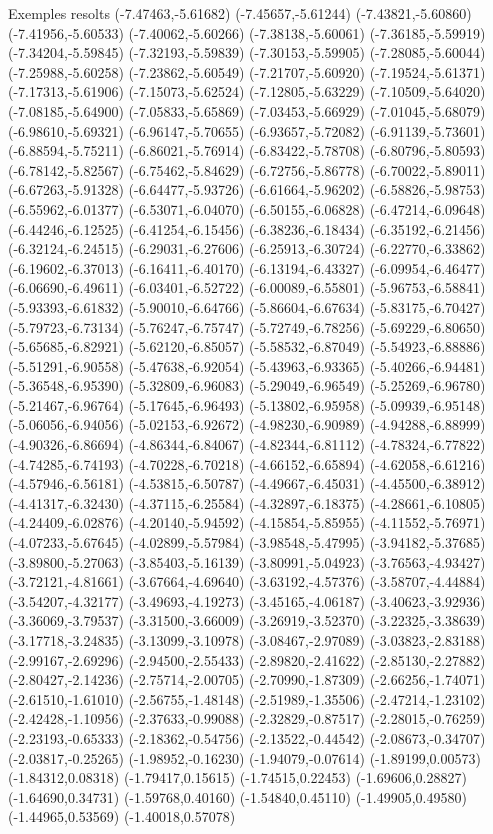 \documentclass[11pt,a4paper]{article}
\begin{document}
\begin{fmex}{Exemples resolts}
(-7.47463,-5.61682) (-7.45657,-5.61244) (-7.43821,-5.60860) (-7.41956,-5.60533) (-7.40062,-5.60266) (-7.38138,-5.60061) (-7.36185,-5.59919) (-7.34204,-5.59845) (-7.32193,-5.59839) (-7.30153,-5.59905) (-7.28085,-5.60044) (-7.25988,-5.60258) (-7.23862,-5.60549) (-7.21707,-5.60920) (-7.19524,-5.61371) (-7.17313,-5.61906) (-7.15073,-5.62524) (-7.12805,-5.63229) (-7.10509,-5.64020) (-7.08185,-5.64900) (-7.05833,-5.65869) (-7.03453,-5.66929) (-7.01045,-5.68079) (-6.98610,-5.69321) (-6.96147,-5.70655) (-6.93657,-5.72082) (-6.91139,-5.73601) (-6.88594,-5.75211) (-6.86021,-5.76914) (-6.83422,-5.78708) (-6.80796,-5.80593) (-6.78142,-5.82567) (-6.75462,-5.84629) (-6.72756,-5.86778) (-6.70022,-5.89011) (-6.67263,-5.91328) (-6.64477,-5.93726) (-6.61664,-5.96202) (-6.58826,-5.98753) (-6.55962,-6.01377) (-6.53071,-6.04070) (-6.50155,-6.06828) (-6.47214,-6.09648) (-6.44246,-6.12525) (-6.41254,-6.15456) (-6.38236,-6.18434) (-6.35192,-6.21456) (-6.32124,-6.24515) (-6.29031,-6.27606) (-6.25913,-6.30724) (-6.22770,-6.33862) (-6.19602,-6.37013) (-6.16411,-6.40170) (-6.13194,-6.43327) (-6.09954,-6.46477) (-6.06690,-6.49611) (-6.03401,-6.52722) (-6.00089,-6.55801) (-5.96753,-6.58841) (-5.93393,-6.61832) (-5.90010,-6.64766) (-5.86604,-6.67634) (-5.83175,-6.70427) (-5.79723,-6.73134) (-5.76247,-6.75747) (-5.72749,-6.78256) (-5.69229,-6.80650) (-5.65685,-6.82921) (-5.62120,-6.85057) (-5.58532,-6.87049) (-5.54923,-6.88886) (-5.51291,-6.90558) (-5.47638,-6.92054) (-5.43963,-6.93365) (-5.40266,-6.94481) (-5.36548,-6.95390) (-5.32809,-6.96083) (-5.29049,-6.96549) (-5.25269,-6.96780) (-5.21467,-6.96764) (-5.17645,-6.96493) (-5.13802,-6.95958) (-5.09939,-6.95148) (-5.06056,-6.94056) (-5.02153,-6.92672) (-4.98230,-6.90989) (-4.94288,-6.88999) (-4.90326,-6.86694) (-4.86344,-6.84067) (-4.82344,-6.81112) (-4.78324,-6.77822) (-4.74285,-6.74193) (-4.70228,-6.70218) (-4.66152,-6.65894) (-4.62058,-6.61216) (-4.57946,-6.56181) (-4.53815,-6.50787) (-4.49667,-6.45031) (-4.45500,-6.38912) (-4.41317,-6.32430) (-4.37115,-6.25584) (-4.32897,-6.18375) (-4.28661,-6.10805) (-4.24409,-6.02876) (-4.20140,-5.94592) (-4.15854,-5.85955) (-4.11552,-5.76971) (-4.07233,-5.67645) (-4.02899,-5.57984) (-3.98548,-5.47995) (-3.94182,-5.37685) (-3.89800,-5.27063) (-3.85403,-5.16139) (-3.80991,-5.04923) (-3.76563,-4.93427) (-3.72121,-4.81661) (-3.67664,-4.69640) (-3.63192,-4.57376) (-3.58707,-4.44884) (-3.54207,-4.32177) (-3.49693,-4.19273) (-3.45165,-4.06187) (-3.40623,-3.92936) (-3.36069,-3.79537) (-3.31500,-3.66009) (-3.26919,-3.52370) (-3.22325,-3.38639) (-3.17718,-3.24835) (-3.13099,-3.10978) (-3.08467,-2.97089) (-3.03823,-2.83188) (-2.99167,-2.69296) (-2.94500,-2.55433) (-2.89820,-2.41622) (-2.85130,-2.27882) (-2.80427,-2.14236) (-2.75714,-2.00705) (-2.70990,-1.87309) (-2.66256,-1.74071) (-2.61510,-1.61010) (-2.56755,-1.48148) (-2.51989,-1.35506) (-2.47214,-1.23102) (-2.42428,-1.10956) (-2.37633,-0.99088) (-2.32829,-0.87517) (-2.28015,-0.76259) (-2.23193,-0.65333) (-2.18362,-0.54756) (-2.13522,-0.44542) (-2.08673,-0.34707) (-2.03817,-0.25265) (-1.98952,-0.16230) (-1.94079,-0.07614) (-1.89199,0.00573) (-1.84312,0.08318) (-1.79417,0.15615) (-1.74515,0.22453) (-1.69606,0.28827) (-1.64690,0.34731) (-1.59768,0.40160) (-1.54840,0.45110) (-1.49905,0.49580) (-1.44965,0.53569) (-1.40018,0.57078) 
\end{fmex}
\end{document}
